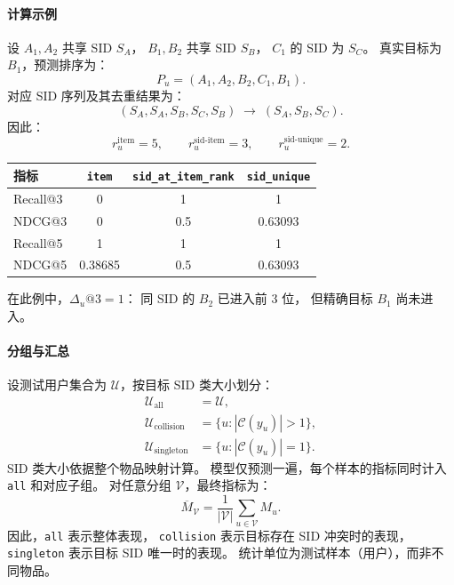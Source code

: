 \documentclass[UTF8,a4paper,zihao=-4,fontset=fandol]{ctexart}
\begin{document}
\paragraph{计算示例}
设 $A_1,A_2$ 共享 SID $S_A$，
$B_1,B_2$ 共享 SID $S_B$，
$C_1$ 的 SID 为 $S_C$。
真实目标为 $B_1$，预测排序为：
\[
    P_u=(A_1,A_2,B_2,C_1,B_1).
\]
对应 SID 序列及其去重结果为：
\[
    (S_A,S_A,S_B,S_C,S_B)
    \;\longrightarrow\;
    (S_A,S_B,S_C).
\]
因此：
\[
    r_u^{\mathrm{item}}=5,\qquad
    r_u^{\mathrm{sid\text{-}item}}=3,\qquad
    r_u^{\mathrm{sid\text{-}unique}}=2.
\]

\begin{center}
\begin{tabular}{lccc}
    \hline
    指标 & \texttt{item}
         & \texttt{sid\_at\_item\_rank}
         & \texttt{sid\_unique}\\
    \hline
    Recall@3 & 0 & 1 & 1\\
    NDCG@3   & 0 & 0.5 & 0.63093\\
    Recall@5 & 1 & 1 & 1\\
    NDCG@5   & 0.38685 & 0.5 & 0.63093\\
    \hline
\end{tabular}
\end{center}

在此例中，$\Delta_u@3=1$：
同 SID 的 $B_2$ 已进入前 3 位，
但精确目标 $B_1$ 尚未进入。

\paragraph{分组与汇总}
设测试用户集合为 $\mathcal{U}$，按目标 SID 类大小划分：
\begin{align}
    \mathcal{U}_{\mathrm{all}}
    &= \mathcal{U},\\
    \mathcal{U}_{\mathrm{collision}}
    &= \{u:|\mathcal{C}(y_u)|>1\},\\
    \mathcal{U}_{\mathrm{singleton}}
    &= \{u:|\mathcal{C}(y_u)|=1\}.
\end{align}
SID 类大小依据整个物品映射计算。
模型仅预测一遍，每个样本的指标同时计入
\texttt{all} 和对应子组。
对任意分组 $\mathcal{V}$，最终指标为：
\[
    \overline{M}_{\mathcal{V}}
    =
    \frac{1}{|\mathcal{V}|}
    \sum_{u\in\mathcal{V}}M_u.
\]
因此，\texttt{all} 表示整体表现，
\texttt{collision} 表示目标存在 SID 冲突时的表现，
\texttt{singleton} 表示目标 SID 唯一时的表现。
统计单位为测试样本（用户），而非不同物品。
\end{document}
